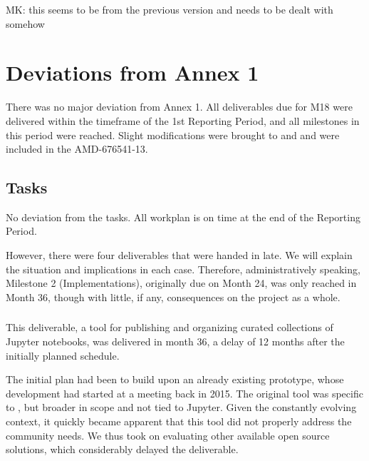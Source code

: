 \begin{oldpart}{MK: this seems to be from the previous version and needs to be dealt with somehow}
  \section{Deviations from Annex 1}

There was no major deviation from Annex 1. All deliverables due for M18 were delivered
  within the timeframe of the 1st Reporting Period, and all milestones in this period were
  reached.  Slight modifications were brought to  and  and were
  included in the AMD-676541-13.

\subsection{Tasks}

No deviation from the tasks. All workplan is on time at the end of the Reporting
Period.

However, there were four deliverables that
were handed in late. We will explain the situation and implications in
each case. Therefore, administratively speaking, Milestone 2
(Implementations), originally due on Month 24, was only reached in
Month 36, though with little, if any, consequences on the project as a
whole.

\subsubsection{\protect{}}
This deliverable, a tool for publishing and organizing curated
collections of Jupyter notebooks, was delivered in month 36, a delay
of 12 months after the initially planned schedule.

The initial plan had been to build upon an already existing prototype,
whose development had started at a \Sage meeting back in 2015. The
original tool was specific to \Sage, but broader in scope and not tied
to Jupyter. Given the constantly evolving context, it quickly became
apparent that this tool did not properly address the community needs.
We thus took on evaluating other available open source solutions,
which considerably delayed the deliverable.


\end{oldpart}
